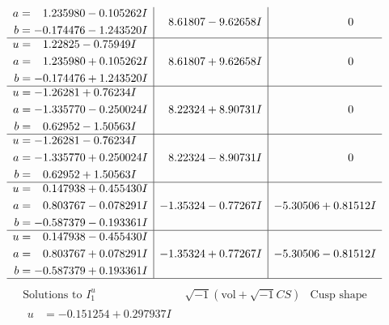 \documentclass[1p]{elsarticle_modified}
\theoremstyle{definition}
\newcommand{\I}{\sqrt{-1}}
\begin{document}
$$\begin{array}{c|c|c}
\begin{aligned}
a &= \phantom{-}1.235980 - 0.105262 I \\
b &= -0.174476 - 1.243520 I\end{aligned}
 & \phantom{-}8.61807 - 9.62658 I & \phantom{-0.000000 } 0 \\ \hline\begin{aligned}
u &= \phantom{-}1.22825 - 0.75949 I \\
a &= \phantom{-}1.235980 + 0.105262 I \\
b &= -0.174476 + 1.243520 I\end{aligned}
 & \phantom{-}8.61807 + 9.62658 I & \phantom{-0.000000 } 0 \\ \hline\begin{aligned}
u &= -1.26281 + 0.76234 I \\
a &= -1.335770 - 0.250024 I \\
b &= \phantom{-}0.62952 - 1.50563 I\end{aligned}
 & \phantom{-}8.22324 + 8.90731 I & \phantom{-0.000000 } 0 \\ \hline\begin{aligned}
u &= -1.26281 - 0.76234 I \\
a &= -1.335770 + 0.250024 I \\
b &= \phantom{-}0.62952 + 1.50563 I\end{aligned}
 & \phantom{-}8.22324 - 8.90731 I & \phantom{-0.000000 } 0 \\ \hline\begin{aligned}
u &= \phantom{-}0.147938 + 0.455430 I \\
a &= \phantom{-}0.803767 - 0.078291 I \\
b &= -0.587379 - 0.193361 I\end{aligned}
 & -1.35324 - 0.77267 I & -5.30506 + 0.81512 I \\ \hline\begin{aligned}
u &= \phantom{-}0.147938 - 0.455430 I \\
a &= \phantom{-}0.803767 + 0.078291 I \\
b &= -0.587379 + 0.193361 I\end{aligned}
 & -1.35324 + 0.77267 I & -5.30506 - 0.81512 I\\
 \hline 
 \end{array}$$\newpage$$\begin{array}{c|c|c}  
\text{Solutions to }I^u_{1}& \I (\text{vol} + \sqrt{-1}CS) & \text{Cusp shape}\\
 \hline 
\begin{aligned}
u &= -0.151254 + 0.297937 I \\

\end{aligned}
\end{array}$$
\end{document}
